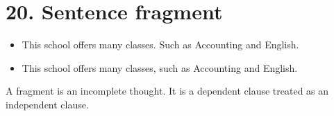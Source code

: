 \section{20. Sentence fragment}

\begin{itemize}
\item This school offers many classes. Such as Accounting and English. 

\item This school offers many classes, such as Accounting and English. 
\end{itemize}

\noindent A fragment is an incomplete thought. It is a dependent clause treated
as an independent clause.

